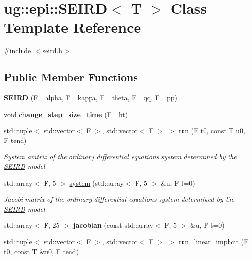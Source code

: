\hypertarget{classug_1_1epi_1_1_s_e_i_r_d}{}\section{ug\+:\+:epi\+:\+:S\+E\+I\+RD$<$ T $>$ Class Template Reference}
\label{classug_1_1epi_1_1_s_e_i_r_d}


{\ttfamily \#include $<$seird.\+h$>$}

\subsection*{Public Member Functions}
\begin{DoxyCompactItemize}
\item 
\mbox{\label{classug_1_1epi_1_1_s_e_i_r_d_afa071cf690a6fbb94ded02abdec47a8a}} 
{\bfseries S\+E\+I\+RD} (F \+\_\+alpha, F \+\_\+kappa, F \+\_\+theta, F \+\_\+qq, F \+\_\+pp)
\item 
\mbox{\label{classug_1_1epi_1_1_s_e_i_r_d_a537a6879b4a4d238d0141aaee478a1a8}} 
void {\bfseries change\+\_\+step\+\_\+size\+\_\+time} (F \+\_\+ht)
\item 
\mbox{\label{classug_1_1epi_1_1_s_e_i_r_d_ae1b0b3727a9b5eb9afe1f41985a74967}} 
std\+::tuple$<$ std\+::vector$<$ F $>$, std\+::vector$<$ F $>$ $>$ \hyperlink{classug_1_1epi_1_1_s_e_i_r_d_ae1b0b3727a9b5eb9afe1f41985a74967}{run} (F t0, const T u0, F tend)
\begin{DoxyCompactList}\small\item\em System amtrix of the ordinary differential equations system determined by the \hyperlink{classug_1_1epi_1_1_s_e_i_r_d}{S\+E\+I\+RD} model. \end{DoxyCompactList}\item 
\mbox{\label{classug_1_1epi_1_1_s_e_i_r_d_a654ab9e70a1efe5a5fd8b0534cd14a37}} 
std\+::array$<$ F, 5 $>$ \hyperlink{classug_1_1epi_1_1_s_e_i_r_d_a654ab9e70a1efe5a5fd8b0534cd14a37}{system} (std\+::array$<$ F, 5 $>$ \&u, F t=0)
\begin{DoxyCompactList}\small\item\em Jacobi matrix of the ordinary differential equations system determined by the \hyperlink{classug_1_1epi_1_1_s_e_i_r_d}{S\+E\+I\+RD} model. \end{DoxyCompactList}\item 
\mbox{\label{classug_1_1epi_1_1_s_e_i_r_d_a97e809ff18e08d75269af918eced73d1}} 
std\+::array$<$ F, 25 $>$ {\bfseries jacobian} (const std\+::array$<$ F, 5 $>$ \&u, F t=0)
\item 
std\+::tuple$<$ std\+::vector$<$ F $>$, std\+::vector$<$ F $>$ $>$ \hyperlink{classug_1_1epi_1_1_s_e_i_r_d_a4b2848690a22845a5164345ad43393a8}{run\+\_\+linear\+\_\+implicit} (F t0, const T \&u0, F tend)
\end{DoxyCompactItemize}
